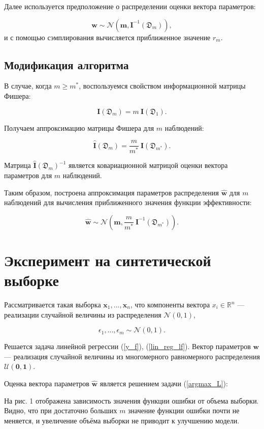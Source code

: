 \documentclass[12pt,twoside]{article}
\begin{document}
Далее используется предположение о распределении оценки вектора параметров:

$$
\hat{\textbf{w}} \sim \mathcal{N}(\textbf{m},  \textbf{I}^{-1}(\mathfrak D_m)),
$$
и с помощью сэмплирования вычисляется приближенное значение $r_m$.

\subsection{Модификация алгоритма}

В случае, когда $m \geq m^*$, воспользуемся свойством информационной матрицы Фишера:

$$
\textbf{I}(\mathfrak D_m) =  m~\textbf{I}(\mathfrak D_1).
$$

Получаем аппроксимацию матрицы Фишера для $m$ наблюдений:

$$
\hat{\textbf{I}}(\mathfrak D_m) = \frac{m}{m^{*}} ~\textbf{I}(\mathfrak D_{m^{*}}).
$$

Матрица $\hat{\textbf{I}}(\mathfrak D_m)^{-1}$  является ковариационной матрицой оценки вектора параметров для $m$ наблюдений.

Таким образом, построена аппроксимация параметров распределения $\hat{\textbf{w}}$ для $m$ наблюдений для вычисления приближенного значения функции эффективности:

$$
\hat{\textbf{w}} \sim \mathcal{N}(\textbf{m},  \frac{m}{m^{*}}~\textbf{I}^{-1}(\mathfrak D_{m^{*}})).
$$

\section{Эксперимент на синтетической выборке}

Рассматривается такая выборка $\mathbf{x}_1, ..., \mathbf{x}_n$, что компоненты вектора $x_i \in \mathds{R}^n$ --- реализации случайной величины из распределения  $\mathcal{N}(0, 1)$, 

$$
\epsilon_1, ..., \epsilon_m \sim \mathcal{N}(0, 1).
$$

Решается задача линейной регрессии (\ref{y_f}), (\ref{lin_reg_lf}). Вектор параметров  $\mathbf{w}$ --- реализация случайной величины из многомерного равномерного  распределения $\mathcal{U}(\mathbf{0}, \mathbf{1})$.

Оценка вектора параметров $\hat{\mathbf{w}}$ является решением задачи (\ref{argmax_L}):

На рис. 1 отображена зависимость значения функции ошибки от объема выборки. Видно, что при достаточно больших $m$ значение функции ошибки почти не меняется, и увеличение объёма выборки не приводит к улучшению модели.
\end{document}
